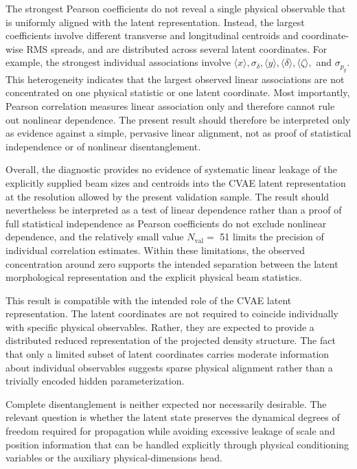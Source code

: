 The strongest Pearson coefficients do not reveal a single physical observable that is uniformly aligned with the latent representation. Instead, the largest coefficients involve different transverse and longitudinal centroids and coordinate-wise RMS spreads, and are distributed across several latent coordinates. For example, the strongest individual associations involve \(\langle x \rangle , \sigma_{\delta} , \langle y \rangle , \langle \delta \rangle , \langle \zeta \rangle ,\) and \(\sigma_{p_{y}} .\) This heterogeneity indicates that the largest observed linear associations are not concentrated on one physical statistic or one latent coordinate. Most importantly, Pearson correlation measures linear association only and therefore cannot rule out nonlinear dependence. The present result should therefore be interpreted only as evidence against a simple, pervasive linear alignment, not as proof of statistical independence or of nonlinear disentanglement.

Overall, the diagnostic provides no evidence of systematic linear leakage of the explicitly supplied beam sizes and centroids into the CVAE latent representation at the resolution allowed by the present validation sample. The result should nevertheless be interpreted as a test of linear dependence rather than a proof of full statistical independence as Pearson coefficients do not exclude nonlinear dependence, and the relatively small value \(N_{\mathrm{val}} =\) 51 limits the precision of individual correlation estimates. Within these limitations, the observed concentration around zero supports the intended separation between the latent morphological representation and the explicit physical beam statistics.

This result is compatible with the intended role of the CVAE latent representation. The latent coordinates are not required to coincide individually with specific physical observables. Rather, they are expected to provide a distributed reduced representation of the projected density structure. The fact that only a limited subset of latent coordinates carries moderate information about individual observables suggests sparse physical alignment rather than a trivially encoded hidden parameterization.

Complete disentanglement is neither expected nor necessarily desirable. The relevant question is whether the latent state preserves the dynamical degrees of freedom required for propagation while avoiding excessive leakage of scale and position information that can be handled explicitly through physical conditioning variables or the auxiliary physical-dimensions head.

